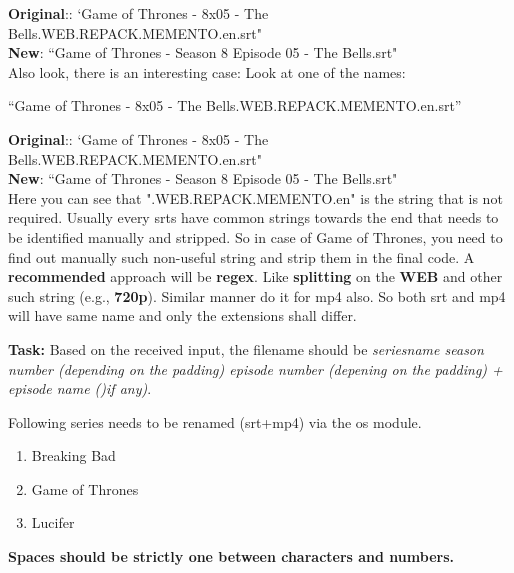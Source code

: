 \documentclass[12pt,  letterpaper,  twoside]{article}
\begin{document}
	
	
	\noindent
	\textbf{Original}:: `Game of Thrones - 8x05 - The 
	Bells.WEB.REPACK.MEMENTO.en.srt"  \\
	\textbf{New}: ``Game of Thrones - Season 8 Episode 05 - 
	The 
	Bells.srt" \\
	
	Also look,  there is an interesting case:
	Look at one of the names:
	
	``Game of Thrones - 8x05 - The 
	Bells.WEB.REPACK.MEMENTO.en.srt''
	 
	
	
	\noindent
\textbf{Original}:: `Game of Thrones - 8x05 - The 
Bells.WEB.REPACK.MEMENTO.en.srt"  \\
\textbf{New}: ``Game of Thrones - Season 8 Episode 05 - 
The 
Bells.srt" \\
	
	 
	
	Here you can see that ".WEB.REPACK.MEMENTO.en" is the string that is not 
	required. 
	Usually every srts have common strings towards the end that needs to be 
	identified manually and stripped. So in case of Game of Thrones,  you need 
	to find 
	out manually such non-useful string and strip them in the final code. A 
	\textbf{recommended} approach will be \textbf{regex}. Like 
	\textbf{splitting} on the \textbf{WEB} and other such string (e.g., 
	\textbf{720p}). Similar manner do it for mp4 also. So both srt and mp4 will 
	have same name and only the extensions shall differ.
	
	\textbf{Task:} Based on the received input,  the filename should be 
	\textit{seriesname season number (depending on the padding) episode number 
	(depening on the padding) + episode name ()if any)}.  
	
	
	Following series needs to be renamed (srt+mp4) via the os module. 
	
	\begin{enumerate}
		\item Breaking Bad
		\item Game of Thrones
				\item Lucifer
	\end{enumerate}
	
	\textbf{
		Spaces should be strictly one between characters and numbers.}
	
	
\end{document}

